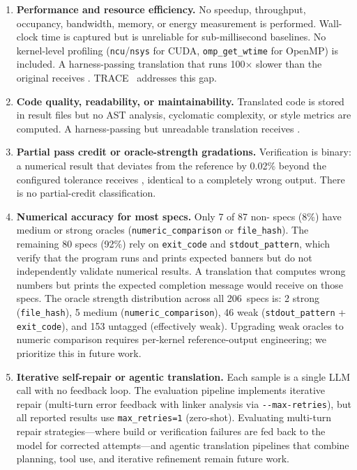 \begin{enumerate}
  \item \textbf{Performance and resource efficiency.} No speedup, throughput,
    occupancy, bandwidth, memory, or energy measurement is performed.
    Wall-clock time is captured but is unreliable for sub-millisecond baselines.
    No kernel-level profiling (\texttt{ncu}/\texttt{nsys} for CUDA,
    \texttt{omp\_get\_wtime} for OpenMP) is included. A harness-passing
    translation that runs 100$\times$ slower than the original receives
    \pass{}. TRACE~\cite{TRACE2026} addresses this gap.

  \item \textbf{Code quality, readability, or maintainability.} Translated
    code is stored in result files but no AST analysis, cyclomatic complexity,
    or style metrics are computed. A harness-passing but unreadable translation receives
    \pass{}.

  \item \textbf{Partial pass credit or oracle-strength gradations.} Verification
    is binary: a numerical result that deviates from the reference by 0.02\%
    beyond the configured tolerance receives \verifyfail{}, identical to a
    completely wrong output. There is no partial-credit classification.

  \item \textbf{Numerical accuracy for most specs.} Only 7 of 87 non-\knownfail{} specs (8\%) have medium or strong oracles (\texttt{numeric\_comparison} or \texttt{file\_hash}). The remaining 80 specs (92\%) rely on \texttt{exit\_code} and \texttt{stdout\_pattern}, which verify that the program runs and prints expected banners but do not independently validate numerical results. A translation that computes wrong numbers but prints the expected completion message would receive \pass{} on those specs. The oracle strength distribution across all 206~specs is: 2 strong (\texttt{file\_hash}), 5 medium (\texttt{numeric\_comparison}), 46 weak (\texttt{stdout\_pattern} + \texttt{exit\_code}), and 153 untagged (effectively weak). Upgrading weak oracles to numeric comparison requires per-kernel reference-output engineering; we prioritize this in future work.
  
  \item \textbf{Iterative self-repair or agentic translation.} Each sample is a single LLM call with no feedback loop. The evaluation pipeline implements iterative repair (multi-turn error feedback with linker analysis via \texttt{-{}-max-retries}), but all reported results use \texttt{max\_retries=1} (zero-shot). Evaluating multi-turn repair strategies---where build or verification failures are fed back to the model for corrected attempts---and agentic translation pipelines that combine planning, tool use, and iterative refinement remain future work.
  

\end{enumerate}
